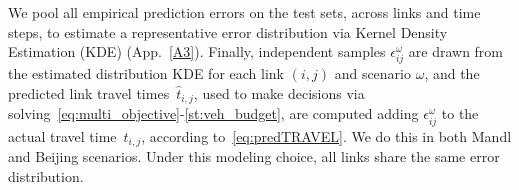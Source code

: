 \documentclass[a4paper,fleqn]{cas-sc}
\begin{document}
We pool all empirical prediction errors on the test sets, across links and time steps, to estimate a representative error distribution via Kernel Density Estimation (KDE) (App.~\ref{A3}). Finally, independent samples $\epsilon_{ij}^{\omega}$ are drawn from the estimated distribution KDE for each link $(i,j)$ and scenario $\omega$, and the predicted link travel times~$\hat t_{i,j}$, used to make decisions via solving~\eqref{eq:multi_objective}-\eqref{st:veh_budget}, are computed adding $\epsilon_{ij}^{\omega}$ to the actual travel time~$t_{i,j}$, according to~\eqref{eq:predTRAVEL}. We do this in both Mandl and Beijing scenarios.
Under this modeling choice, all links share the same error distribution.

\end{document}
